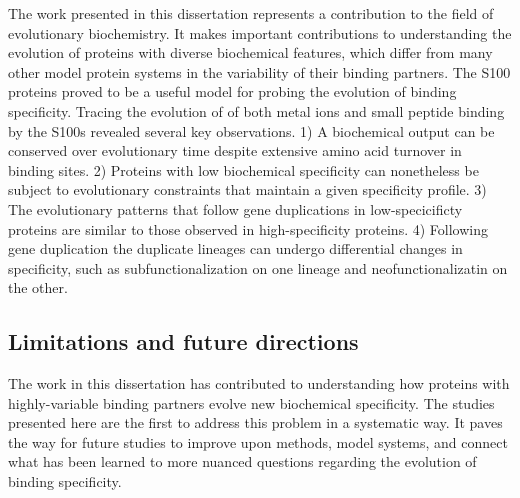 The work presented in this dissertation represents a contribution
to the field of evolutionary biochemistry. It makes important contributions
to understanding the evolution of proteins with diverse biochemical
features, which differ from many other model protein systems in the
variability of their binding partners. The S100 proteins proved to
be a useful model for probing the evolution of binding specificity.
Tracing the evolution of of both metal ions and small peptide binding
by the S100s revealed several key observations. 1) A biochemical output
can be conserved over evolutionary time despite extensive amino acid
turnover in binding sites. 2) Proteins with low biochemical specificity
can nonetheless be subject to evolutionary constraints that maintain
a given specificity profile. 3) The evolutionary patterns that follow
gene duplications in low-specicificty proteins are similar to those
observed in high-specificity proteins. 4) Following gene duplication
the duplicate lineages can undergo differential changes in specificity,
such as subfunctionalization on one lineage and neofunctionalizatin
on the other. 

\subsection{Limitations and future directions}

The work in this dissertation has contributed to understanding how
proteins with highly-variable binding partners evolve new biochemical
specificity. The studies presented here are the first to address this
problem in a systematic way. It paves the way for future studies to
improve upon methods, model systems, and connect what has been learned
to more nuanced questions regarding the evolution of binding specificity. 

